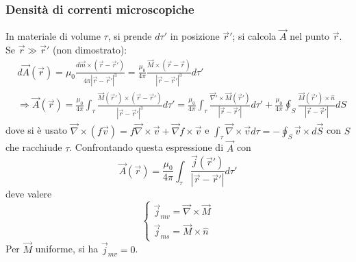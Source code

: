 \documentclass[a4paper]{scrartcl}
\numberwithin{equation}{subsection}
\theoremstyle{style1}
\begin{document}
\subsubsection{Densit\`a di correnti microscopiche}
In materiale di volume $\tau $, si prende $d\tau '$ in posizione $\vec{r}'$; si calcola $\vec{A}$ nel punto $\vec{r}$. Se $\vec{r} \gg \vec{r}'$ (non dimostrato):
\begin{equation*}
	\begin{split}
		&d\vec{A}(\vec{r}) = \mu_0 \frac{d\vec{m}\times( \vec{r}-\vec{r}')}{4\pi \left\lvert \vec{r}-\vec{r}' \right\rvert ^3} = \frac{\mu_0}{4 \pi} \frac{\vec{M} \times (\vec{r}-\vec{r})}{\left\lvert \vec{r}-\vec{r}' \right\rvert^3 } d\tau '\\
		&\Rightarrow \vec{A}(\vec{r}) = \frac{\mu_0}{4\pi}\int_{\tau } \frac{\vec{M}(\vec{r}') \times (\vec{r}-\vec{r}')}{\left\lvert \vec{r}-\vec{r}' \right\rvert ^3}d\tau ' = \frac{\mu_0}{4\pi} \int_{\tau } \frac{\vec{\nabla }' \times \vec{M}(\vec{r}')}{\left\lvert \vec{r}-\vec{r}' \right\rvert } d\tau '+\frac{\mu_0}{4 \pi}\oint_{S} \frac{\vec{M}(\vec{r}') \times \hat{n}}{\left\lvert \vec{r}-\vec{r}' \right\rvert }dS
	\end{split}
\end{equation*}
dove si \`e usato $\vec{\nabla }\times (f\vec{v}) = f\vec{\nabla }\times \vec{v} + \vec{\nabla }f\times \vec{v}$ e $\int_{\tau } \vec{\nabla }\times \vec{v}d\tau  = - \oint_{S} \vec{v}\times d\vec{S}$ con $S$ che racchiude $\tau $. Confrontando questa espressione di $\vec{A}$ con
\begin{equation*}
	\vec{A}(\vec{r}) = \frac{\mu_0}{4\pi}\int_{\tau } \frac{\vec{j}(\vec{r}')}{\left\lvert \vec{r}-\vec{r}' \right\rvert }d\tau '
\end{equation*}
deve valere
\begin{equation}
	\begin{cases}
		\vec{j}_{mv} = \vec{\nabla }\times \vec{M}\\
		\vec{j}_{ms} = \vec{M}\times \hat{n}
	\end{cases}
\end{equation}
Per $\vec{M}$ uniforme, si ha $ \vec{j}_{mv} =0$.
\end{document}
